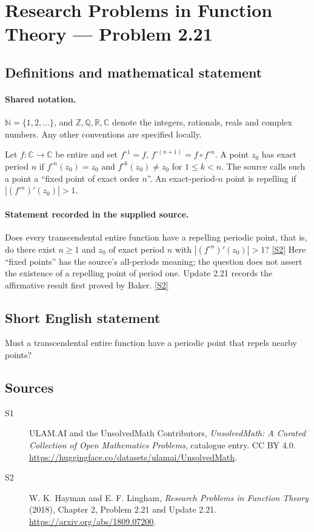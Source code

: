 \documentclass[11pt]{article}
\newcommand{\sref}[2]{\hyperlink{source:#1:#2}{[S#2]}}
\begin{document}
\section{Research Problems in Function Theory — Problem 2.21}\label{statement}

\subsection{Definitions and mathematical statement}

\paragraph{Shared notation.}$\mathbb N=\{1,2,\ldots\}$, and $\mathbb Z,\mathbb Q,\mathbb R,\mathbb C$ denote the integers, rationals, reals and complex numbers. Any other conventions are specified locally.


Let $f:\mathbb C\to\mathbb C$ be entire and set $f^{\circ1}=f$, $f^{\circ(n+1)}=f\circ f^{\circ n}$.
A point $z_0$ has exact period $n$ if $f^{\circ n}(z_0)=z_0$ and $f^{\circ k}(z_0)\ne z_0$ for $1\le k<n$.
The source calls such a point a ``fixed point of exact order $n$''.
An exact-period-$n$ point is repelling if $|(f^{\circ n})'(z_0)|>1$.

\paragraph{Statement recorded in the supplied source.}
Does every transcendental entire function have a repelling periodic point, that is, do there exist $n\ge1$ and $z_0$ of exact period $n$ with $|(f^{\circ n})'(z_0)|>1$? \sref{statement}{2}
Here ``fixed points'' has the source's all-periods meaning; the question does not assert the existence of a repelling point of period one. Update 2.21 records the affirmative result first proved by Baker. \sref{statement}{2}
\subsection{Short English statement}
Must a transcendental entire function have a periodic point that repels nearby points?
\subsection{Sources}
\begin{description}
\item[\hypertarget{source:statement:1}{S1}] ULAM.AI and the UnsolvedMath Contributors, \emph{UnsolvedMath: A Curated Collection of Open Mathematics Problems}, catalogue entry. CC BY 4.0. \url{https://huggingface.co/datasets/ulamai/UnsolvedMath}.
\item[\hypertarget{source:statement:2}{S2}] W. K. Hayman and E. F. Lingham, \emph{Research Problems in Function Theory} (2018), Chapter 2, Problem 2.21 and Update 2.21. \url{https://arxiv.org/abs/1809.07200}.
\end{description}
\label{end:statement}
\end{document}
